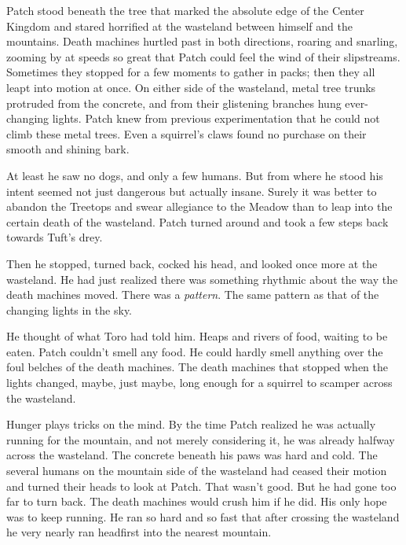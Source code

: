 \documentclass[12pt]{book}
\begin{document}
Patch stood beneath the tree that marked the absolute edge of the Center Kingdom and stared horrified at the wasteland between himself and the mountains. Death machines hurtled past in both directions, roaring and snarling, zooming by at speeds so great that Patch could feel the wind of their slipstreams. Sometimes they stopped for a few moments to gather in packs; then they all leapt into motion at once. On either side of the wasteland, metal tree trunks protruded from the concrete, and from their glistening branches hung ever-changing lights. Patch knew from previous experimentation that he could not climb these metal trees. Even a squirrel's claws found no purchase on their smooth and shining bark.

At least he saw no dogs, and only a few humans. But from where he stood his intent seemed not just dangerous but actually insane. Surely it was better to abandon the Treetops and swear allegiance to the Meadow than to leap into the certain death of the wasteland. Patch turned around and took a few steps back towards Tuft's drey.

Then he stopped, turned back, cocked his head, and looked once more at the wasteland. He had just realized there was something rhythmic about the way the death machines moved. There was a {\it pattern}. The same pattern as that of the changing lights in the sky.

He thought of what Toro had told him. Heaps and rivers of food, waiting to be eaten. Patch couldn't smell any food. He could hardly smell anything over the foul belches of the death machines. The death machines that stopped when the lights changed, maybe, just maybe, long enough for a squirrel to scamper across the wasteland.

Hunger plays tricks on the mind. By the time Patch realized he was actually running for the mountain, and not merely considering it, he was already halfway across the wasteland. The concrete beneath his paws was hard and cold. The several humans on the mountain side of the wasteland had ceased their motion and turned their heads to look at Patch. That wasn't good. But he had gone too far to turn back. The death machines would crush him if he did. His only hope was to keep running. He ran so hard and so fast that after crossing the wasteland he very nearly ran headfirst into the nearest mountain.
\end{document}
